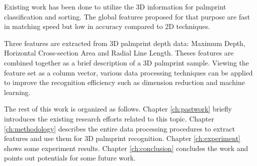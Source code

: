 Existing work has been done to utilize the 3D information for palmprint classification and sorting. The global features proposed for that purpose are fast in matching speed but low in accuracy compared to 2D techniques.

Three features are extracted from 3D palmprint depth data: Maximum Depth, Horizontal Cross-section Area and Radial Line Length. Theses features are combined together as a brief description of a 3D palmprint sample. Viewing the feature set as a column vector, various data processing techniques can be applied to improve the recognition efficiency such as dimension reduction and machine learning.

The rest of this work is organized as follows. Chapter \ref{ch:pastwork} briefly introduces the existing research efforts related to this topic. Chapter \ref{ch:methodology} describes the entire data processing procedures to extract features and use them for 3D palmprint recognition. Chapter \ref{ch:experiment} shows some experiment results. Chapter \ref{ch:conclusion} concludes the work and points out potentials for some future work.
